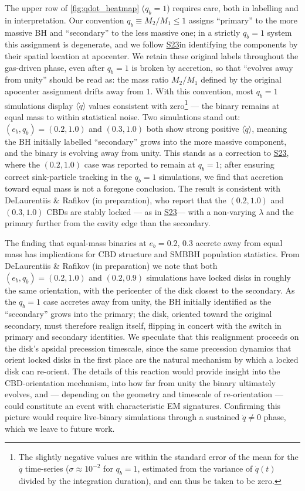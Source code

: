\documentclass[fleqn,usenatbib]{mnras}
\newcommand{\Stwentythree}{\href{https://doi.org/10.1093/mnras/stac3263}{S23}}
\begin{document}
The upper row of \autoref{fig:qdot_heatmap} ($q_b = 1$) requires care, both in labelling and in interpretation. Our convention $q_b \equiv M_2/M_1 \leq 1$ assigns ``primary'' to the more massive BH and ``secondary'' to the less massive one; in a strictly $q_b = 1$ system this assignment is degenerate, and we follow \Stwentythree in identifying the components by their spatial location at apocenter. We retain these original labels throughout the gas-driven phase, even after $q_b = 1$ is broken by accretion, so that ``evolves away from unity'' should be read as: the mass ratio $M_2/M_1$ defined by the original apocenter assignment drifts away from $1$. With this convention, most $q_b = 1$ simulations display $\langle \dot{q} \rangle$ values consistent with zero\footnote{The slightly negative values are within the standard error of the mean for the $\dot{q}$ time-series ($\sigma \approx 10^{-2}$ for $q_b = 1$, estimated from the variance of $\dot{q}(t)$ divided by the integration duration), and can thus be taken to be zero.} --- the binary remains at equal mass to within statistical noise. Two simulations stand out: $(e_b, q_b) = (0.2, 1.0)$ and $(0.3, 1.0)$ both show strong positive $\langle \dot{q} \rangle$, meaning the BH initially labelled ``secondary'' grows into the more massive component, and the binary is evolving away from unity. This stands as a correction to \Stwentythree, where the $(0.2, 1.0)$ case was reported to remain at $q_b = 1$; after ensuring correct sink-particle tracking in the $q_b = 1$ simulations, we find that accretion toward equal mass is not a foregone conclusion. The result is consistent with DeLaurentiis \& Rafikov (in preparation), who report that the $(0.2, 1.0)$ and $(0.3, 1.0)$ CBDs are stably locked --- as in \Stwentythree --- with a non-varying $\lambda$ and the primary further from the cavity edge than the secondary.

The finding that equal-mass binaries at $e_b = 0.2, \, 0.3$ accrete away from equal mass has implications for CBD structure and SMBBH population statistics. From DeLaurentiis \& Rafikov (in preparation) we note that both $(e_b, q_b) = (0.2, 1.0)$ and $(0.2, 0.9)$ simulations have locked disks in roughly the same orientation, with the pericenter of the disk closest to the secondary. As the $q_b = 1$ case accretes away from unity, the BH initially identified as the ``secondary'' grows into the primary; the disk, oriented toward the original secondary, must therefore realign itself, flipping in concert with the switch in primary and secondary identities. We speculate that this realignment proceeds on the disk's apsidal precession timescale, since the same precession dynamics that orient locked disks in the first place are the natural mechanism by which a locked disk can re-orient. The details of this reaction would provide insight into the CBD-orientation mechanism, into how far from unity the binary ultimately evolves, and --- depending on the geometry and timescale of re-orientation --- could constitute an event with characteristic EM signatures. Confirming this picture would require live-binary simulations through a sustained $\dot{q} \neq 0$ phase, which we leave to future work. 
\end{document}

